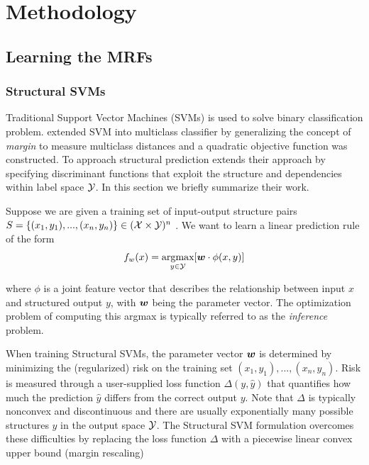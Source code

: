 
\chapter{Methodology}
\label{cha:methodology}

\section{Learning the MRFs}
\label{sec:learning}

\subsection{Structural SVMs}
\label{sec:ssvm}

Traditional Support Vector Machines (SVMs) is used to solve
binary classification problem. 
extended SVM into multiclass classifier by generalizing the
concept of \emph{margin} to measure multiclass distances and a
quadratic objective function was constructed. To approach
structural prediction  extends
their approach by specifying discriminant functions that exploit
the structure and dependencies within label space ${\cal Y}$. In this
section we briefly summarize their work.

Suppose we are given a training set of input-output structure
pairs $S=\{(x_1,y_1),...,(x_n,y_n)\}\in({\cal X}\times {\cal Y})^n$ . We want
to learn a linear prediction rule of the form
\begin{align}
  \label{eq:ssvm}
  f_w(x)=\mathop{\textrm{argmax}}_{ y\in {\cal Y} } [{\boldsymbol{w}}\cdot\phi(x,y)]
\end{align}


where $\phi$ is a joint feature vector that describes the
relationship between input $x$ and structured output $y$, with
${\boldsymbol{w}}$ being the parameter vector. The optimization problem of
computing this argmax is typically referred to as the \emph{
  inference } problem.

When training Structural SVMs, the parameter vector ${\boldsymbol{w}}$ is
determined by minimizing the (regularized) risk on the training
set $(x_1,y_1),...,(x_n,y_n)$. Risk is measured through a
user-supplied loss function $\Delta(y,\hat{ y })$ that quantifies
how much the prediction $\hat{y}$ differs from the correct output
$y$. Note that $\Delta$ is typically nonconvex and discontinuous
and there are usually exponentially many possible structures
$\hat{y}$ in the output space ${\cal Y}$. The Structural SVM
formulation\cite{tsochantaridis2005large} overcomes these
difficulties by replacing the loss function $\Delta$ with a
piecewise linear convex upper bound (margin rescaling)

